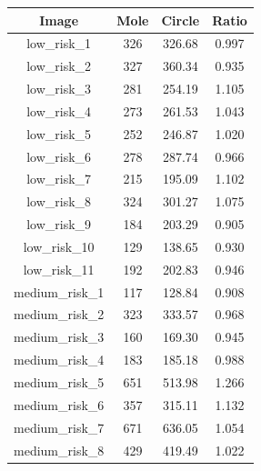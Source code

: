 \documentclass[12pt]{report}
\begin{document}
\begin{table}[ht]\footnotesize
\begin{minipage}[b]{0.5\linewidth}%
\begin{tabular}{|c|c|c|c|}
\hline
 \textbf{Image}  & \textbf{Mole} & \textbf{Circle} & \textbf{Ratio} \\
\hline
low\_risk\_1                          &326                     &326.68         &0.997\\
low\_risk\_2                          &327                     &360.34         &0.935\\
low\_risk\_3                          &281                     &254.19         &1.105\\
low\_risk\_4                          &273                     &261.53         &1.043\\
low\_risk\_5                          &252                     &246.87         &1.020\\
low\_risk\_6                          &278                     &287.74		    &0.966\\
low\_risk\_7                          &215                     &195.09	     	&1.102\\
low\_risk\_8                          &324                     &301.27	 		&1.075\\
low\_risk\_9                          &184                     &203.29         &0.905\\
low\_risk\_10                         &129                     &138.65         &0.930\\
low\_risk\_11                         &192                     &202.83	        &0.946\\
medium\_risk\_1                       &117						&128.84			&0.908\\
medium\_risk\_2                       &323						&333.57			&0.968\\
medium\_risk\_3                       &160						&169.30			&0.945\\
medium\_risk\_4                       &183						&185.18			&0.988\\
medium\_risk\_5                       &651						&513.98			&1.266\\
medium\_risk\_6                       &357						&315.11			&1.132\\
medium\_risk\_7                       &671						&636.05			&1.054\\
medium\_risk\_8                       &429		                &419.49			&1.022\\

\end{tabular}
\end{minipage}
\end{table}
\end{document}
